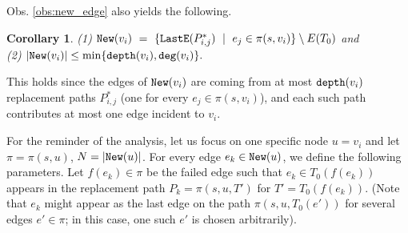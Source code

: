 \documentclass[12pt]{article}
\newtheorem{corollary}[theorem]{Corollary}
\def\deg{\mbox{\tt deg}}
\def\depth{\mbox{\tt depth}}
\newcommand{\New}[0]{\mbox{\tt New}}
\def\LastE{\mbox{\tt LastE}}
\begin{document}
Obs. \ref{obs:new_edge} also yields the following.
\begin{corollary}
(1) $\New(v_i) ~=~\{\LastE(P^*_{i,j})~\mid~ e_j \in \pi(s,v_i)\} \setminus E(T_0)$
and \\
(2) $|\New(v_i)| \leq \min\{\depth(v_i), \deg(v_i)\}.$
\end{corollary}
This holds since the edges of $\New(v_i)$ are coming from at most
$\depth(v_i)$ replacement paths $P^*_{i,j}$
(one for every $e_j \in \pi(s, v_i)$),
and each such path contributes at most one edge incident to $v_i$.
\par For the reminder of the analysis, let us focus on
one specific node $u=v_i$ and let  $\pi=\pi(s,u)$, $N=|\New(u)|$.
For every edge $e_k \in \New(u)$, we define the following parameters.
Let $f(e_k) \in \pi$ be the failed edge such that $e_k \in T_0(f(e_k))$
appears in the replacement path $P_k=\pi(s, u,T')$ for $T'= T_0(f(e_k))$.
(Note that $e_k$ might appear as the last edge on the path $\pi(s, u, T_0(e'))$
for several edges $e' \in \pi$; in this case, one such $e'$ is chosen arbitrarily).
\end{document}
